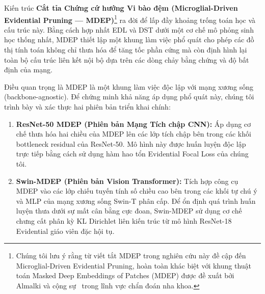\documentclass[11pt, a4paper]{article}
\begin{document}
Kiến trúc \textbf{Cắt tỉa Chứng cứ hướng Vi bào đệm (Microglial-Driven Evidential Pruning --- MDEP)}\footnote{Chúng tôi lưu ý rằng từ viết tắt MDEP trong nghiên cứu này đề cập đến Microglial-Driven Evidential Pruning, hoàn toàn khác biệt với khung thuật toán Masked Deep Embeddings of Patches (MDEP) được đề xuất bởi Almalki và cộng sự~\cite{almalki2025self} trong lĩnh vực chẩn đoán nha khoa.} ra đời để lấp đầy khoảng trống toán học và cấu trúc này. Bằng cách hợp nhất EDL và DST dưới một cơ chế mô phỏng sinh học thống nhất, MDEP thiết lập một khung làm việc phổ quát cho phép các đồ thị tính toán không chỉ thưa hóa để tăng tốc phần cứng mà còn định hình lại toàn bộ cấu trúc liên kết nội bộ dựa trên các dòng chảy bằng chứng và độ bất định của mạng.

Điều quan trọng là MDEP là một khung làm việc độc lập với mạng xương sống (backbone-agnostic). Để chứng minh khả năng áp dụng phổ quát này, chúng tôi trình bày và xác thực hai phiên bản triển khai chính:
\begin{enumerate}
    \item \textbf{ResNet-50 MDEP (Phiên bản Mạng Tích chập CNN):} Áp dụng cơ chế thưa hóa hai chiều của MDEP lên các lớp tích chập bên trong các khối bottleneck residual của ResNet-50. Mô hình này được huấn luyện độc lập trực tiếp bằng cách sử dụng hàm hao tổn Evidential Focal Loss của chúng tôi.
    \item \textbf{Swin-MDEP (Phiên bản Vision Transformer):} Tích hợp công cụ MDEP vào các lớp chiếu tuyến tính số chiều cao bên trong các khối tự chú ý và MLP của mạng xương sống Swin-T phân cấp. Để ổn định quá trình huấn luyện thưa dưới sự mất cân bằng cực đoan, Swin-MDEP sử dụng cơ chế chưng cất phân kỳ KL Dirichlet liên kiến trúc từ mô hình ResNet-18 Evidential giáo viên đặc hội tụ.
\end{enumerate}
\end{document}
